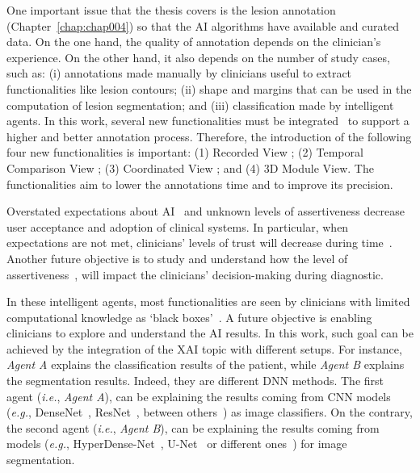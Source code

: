 One important issue that the thesis covers is the lesion annotation (Chapter~\ref{chap:chap004}) so that the \ac{AI} algorithms have available and curated data.
On the one hand, the quality of annotation depends on the clinician’s experience.
On the other hand, it also depends on the number of study cases, such as:
(i) annotations made manually by clinicians useful to extract functionalities like lesion contours;
(ii) shape and margins that can be used in the computation of lesion segmentation; and
(iii) classification made by intelligent agents.
In this work, several new functionalities must be integrated~\cite{hugo2020si} to support a higher and better annotation process.
Therefore, the introduction of the following four new functionalities is important:
(1) Recorded View ;
(2) Temporal Comparison View ;
(3) Coordinated View ; and
(4) 3D Module View.
The functionalities aim to lower the annotations time and to improve its precision.

Overstated expectations about \ac{AI}~\cite{https://doi.org/10.13140/rg.2.2.25412.68486, calisto2019midaaiarfuv} and unknown levels of assertiveness decrease user acceptance and adoption of clinical systems.
In particular, when expectations are not met, clinicians' levels of trust will decrease during time~\cite{Kocielnik:2019:YAI:3290605.3300641}.
Another future objective is to study and understand how the level of assertiveness~\cite{10.1145/3311350.3347162, pacheco2019alignment}, will impact the clinicians' decision-making during diagnostic.

In these intelligent agents, most functionalities are seen by clinicians with limited computational knowledge as `black boxes'~\cite{10.1145/3313831.3376807}.
A future objective is enabling clinicians to explore and understand the \ac{AI} results.
In this work, such goal can be achieved by the integration of the \ac{XAI} topic with different setups.
For instance, {\it Agent A} explains the classification results of the patient, while {\it Agent B} explains the segmentation results.
Indeed, they are different \ac{DNN} methods.
The first agent ({\it i.e.}, {\it Agent A}), can be explaining the results coming from \ac{CNN} models ({\it e.g.}, DenseNet~\cite{Huang_2017_CVPR}, ResNet~\cite{He_2016_CVPR}, between others~\cite{10.1117/12.2549103}) as image classifiers.
On the contrary, the second agent ({\it i.e.}, {\it Agent B}), can be explaining the results coming from models ({\it e.g.}, HyperDense-Net~\cite{8515234}, U-Net~\cite{10.1007/978-3-319-24574-4_28} or different ones~\cite{10.1007/978-3-030-46640-4_23}) for image segmentation.

